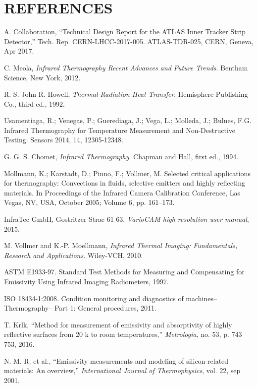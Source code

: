 \pagestyle{references}

\section*{\uppercase{References}}\label{referen}
	\bigskip
	\bigskip
	\begin{enumerate}[label={[\arabic*]}]
		\item A. Collaboration, “Technical Design Report for the ATLAS Inner Tracker Strip Detector,”
		Tech. Rep. CERN-LHCC-2017-005. ATLAS-TDR-025, CERN, Geneva, Apr 2017.
		\item C. Meola,	\textit{Infrared Thermography Recent Advances and Future Trends}. Bentham Science, New	York, 2012.
		\item R. S. John R. Howell,	\textit{Thermal Radiation Heat Transfer}. Hemisphere Publishing Co., third ed.,	1992.
		\item Usamentiaga, R.; Venegas, P.; Guerediaga, J.; Vega, L.; Molleda, J.; Bulnes, F.G. Infrared Thermography for Temperature Measurement and Non-Destructive Testing. Sensors 2014, 14, 12305-12348. 
		\item G. G. S. Chomet, \textit{Infrared Thermography}. Chapman and Hall, first ed., 1994.
		\item Mollmann, K.; Karstadt, D.; Pinno, F.; Vollmer, M. Selected critical applications for thermography: Convections in fluids, selective emitters and highly reflecting materials. In Proceedings of the Infrared Camera Calibration Conference, Las Vegas, NV, USA, October 2005; Volume 6, pp. 161–173.
		\item  InfraTec GmbH, Gostritzer Strae 61  63, \textit{VarioCAM \textregistered\space high resolution user manual}, 2015.
		\item   M. Vollmer and K.-P. Moellmann,	\textit{Infrared Thermal Imaging: Fundamentals, Research and Applications}. Wiley-VCH, 2010.
		\item ASTM E1933-97. Standard Test Methods for Measuring and Compensating for Emissivity Using Infrared Imaging Radiometers, 1997.
		\item ISO 18434-1:2008. Condition monitoring and diagnostics of machines–Thermography– Part 1: General procedures, 2011.
		\item  T. Krlk, “Method for measurement of emissivity and absorptivity of highly reflective surfaces from 20 k to room temperatures,” \textit{Metrologia}, no. 53, p. 743 753, 2016.
		\item N.  M.  R.  et  al., “Emissivity  measurements and  modeling of silicon-related materials: An overview,” \textit{International Journal of Thermophysics}, vol. 22, sep 2001.
		\item 
		\item 
		\item 
	\end{enumerate}
	